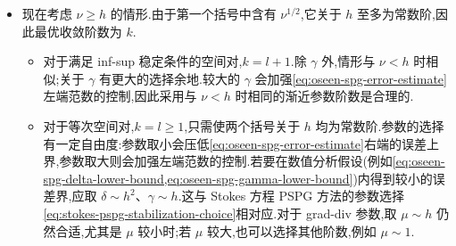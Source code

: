 \begin{note}[稳定化参数的最优渐近性]
\begin{itemize}
  \item 现在考虑 $\nu\ge h$ 的情形.由于第一个括号中含有 $\nu^{1/2}$,它关于 $h$ 至多为常数阶,因此最优收敛阶数为 $k$.
  \begin{itemize}
    \item 对于满足 inf-sup 稳定条件的空间对,$k=l+1$.除 $\gamma$ 外,情形与 $\nu<h$ 时相似;关于 $\gamma$ 有更大的选择余地.较大的 $\gamma$ 会加强\cref{eq:oseen-spg-error-estimate}左端范数的控制,因此采用与 $\nu<h$ 时相同的渐近参数阶数是合理的.

    \item 对于等次空间对,$k=l\ge1$,只需使两个括号关于 $h$ 均为常数阶.参数的选择有一定自由度:参数取小会压低\cref{eq:oseen-spg-error-estimate}右端的误差上界,参数取大则会加强左端范数的控制.若要在数值分析假设(例如\cref{eq:oseen-spg-delta-lower-bound,eq:oseen-spg-gamma-lower-bound})内得到较小的误差界,应取 $\delta\sim h^2$、$\gamma\sim h$.这与 Stokes 方程 PSPG 方法的参数选择\cref{eq:stokes-pspg-stabilization-choice}相对应.对于 grad-div 参数,取 $\mu\sim h$ 仍然合适,尤其是 $\mu$ 较小时;若 $\mu$ 较大,也可以选择其他阶数,例如 $\mu\sim1$.
  \end{itemize}
\end{itemize}
\end{note}

